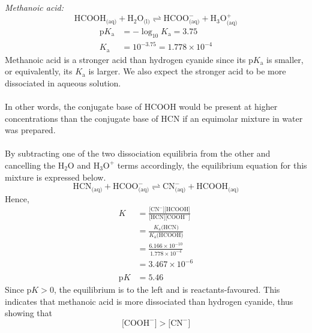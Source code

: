 \documentclass[11pt,a4paper]{article}
\begin{document}
	\emph{Methanoic acid:}
	$$\text{HCOOH}_{\text{(aq)}} + \text{H}_2 \text{O}_{\text{(l)}} \rightleftharpoons \text{HCOO}^-_{\text{(aq)}} + \text{H}_3 \text{O}_{\text{(aq)}}^+$$
	\begin{align*}
		\text{p} K_{\text{a}} &= -\log_{10} K_{\text{a}} = 3.75 \\
		K_{\text{a}} &= 10^{-3.75} = 1.778 \times 10^{-4}
	\end{align*}
	Methanoic acid is a stronger acid than hydrogen cyanide since its p$K_{\text{a}}$ is smaller, or equivalently, its $K_{\text{a}}$ is larger. We also expect the stronger acid to be
	more dissociated in aqueous solution. \\
	\\
           In other words, the conjugate base of HCOOH would be present at higher concentrations than the conjugate base of HCN if an equimolar mixture in water was prepared. \\
	\\
	By subtracting one of the two dissociation equilibria from the other and cancelling the $\text{H}_2 \text{O}$ and $\text{H}_3 \text{O}^+$ terms accordingly, the equilibrium equation 		for this mixture is expressed below.
	$$\text{HCN}_{\text{(aq)}} + \text{HCOO}^-_{\text{(aq)}} \rightleftharpoons \text{CN}^-_{\text{(aq)}} + \text{HCOOH}_{\text{(aq)}}$$
	Hence,
	\begin{align*}
		K &= \frac{\big[\text{CN}^-\big] \big[\text{HCOOH} \big]}{\big[\text{HCN} \big] \big[\text{COOH}^- \big]} \\
		&= \frac{K_\text{a} \text{(HCN)}}{K_\text{a} \text{(HCOOH)}} \\
		&= \frac{6.166 \times 10^{-10}}{1.778 \times 10^{-4}} \\
		&= 3.467 \times 10^{-6} \\
		\\
		\text{p}K &= 5.46 
	\end{align*}
	Since p$K > 0$, the equilibrium is to the left and is reactants-favoured. This indicates that methanoic acid is more dissociated than hydrogen cyanide, thus showing that
	$$\big[\text{COOH}^- \big] > \big[\text{CN}^-\big]$$
\end{document}
